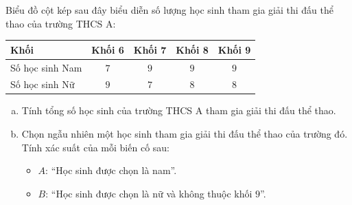 \begin{bt}%
Biểu đồ cột kép sau đây biểu diễn số lượng học sinh tham gia giải thi đấu thể thao của trường THCS A:
\begin{center}
\begin{tabular}{|l|c|c|c|c|}
\hline
\textbf{Khối} & \textbf{Khối 6} & \textbf{Khối 7} & \textbf{Khối 8} & \textbf{Khối 9} \\ \hline
Số học sinh Nam & $7$ & $9$ & $9$ & $9$ \\ \hline
Số học sinh Nữ & $9$ & $7$ & $8$ & $8$ \\ \hline
\end{tabular}
\end{center}
\begin{enumerate}[a)]
    \item Tính tổng số học sinh của trường THCS A tham gia giải thi đấu thể thao.
    \item Chọn ngẫu nhiên một học sinh tham gia giải thi đấu thể thao của trường đó. Tính xác suất của mỗi biến cố sau:
    \begin{itemize}
        \item $A$: ``Học sinh được chọn là nam''.
        \item $B$: ``Học sinh được chọn là nữ và không thuộc khối $9$''.
    \end{itemize}
\end{enumerate}
\end{bt}

